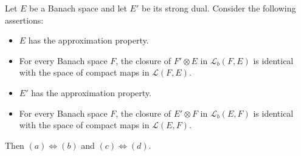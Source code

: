 Let $E$ be a Banach space and let $E'$ be its strong dual. Consider the following assertions:

\begin{itemize}
\item[(a)] $E$ has the approximation property.
\item[(b)] For every Banach space $F$, the closure of $F' \otimes E$ in $\mathcal{L}_b(F, E)$ is identical with the space of compact maps in $\mathcal{L}(F, E)$.
\item[(c)] $E'$ has the approximation property.
\item[(d)] For every Banach space $F$, the closure of $E' \otimes F$ in $\mathcal{L}_b(E, F)$ is identical with the space of compact maps in $\mathcal{L}(E, F)$.
\end{itemize}

Then $(a) \Leftrightarrow (b)$ and $(c) \Leftrightarrow (d)$.
